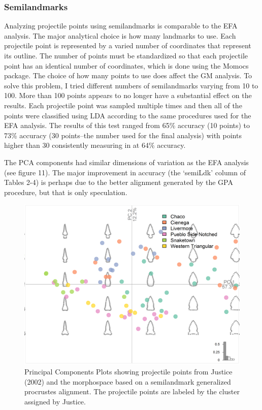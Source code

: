 \documentclass[a4paper]{article}
\begin{document}
\hypertarget{semilandmarks}{%
\subsubsection*{Semilandmarks}\label{semilandmarks}}

Analyzing projectile points using semilandmarks is comparable to the EFA analysis. The major analytical choice is how many landmarks to use. Each projectile point is represented by a varied number of coordinates that represent its outline. The number of points must be standardized so that each projectile point has an identical number of coordinates, which is done using the Momocs package. The choice of how many points to use does affect the GM analysis. To solve this problem, I tried different numbers of semilandmarks varying from 10 to 100. More than 100 points appears to no longer have a substantial effect on the results. Each projectile point was sampled multiple times and then all of the points were classified using LDA according to the same procedures used for the EFA analysis. The results of this test ranged from 65\% accuracy (10 points) to 73\% accuracy (30 points--the number used for the final analysis) with points higher than 30 consistently measuring in at 64\% accuracy.

The PCA components had similar dimensions of variation as the EFA analysis (see figure 11). The major improvement in accuracy (the `semiLdk' column of Tables 2-4) is perhaps due to the better alignment generated by the GPA procedure, but that is only speculation.

\begin{figure}
\includegraphics[width=1\linewidth]{figures/JusticeSLDKPCA} \caption{Principal Components Plots showing projectile points from Justice (2002) and the morphospace based on a semilandmark generalized procrustes alignment. The projectile points are labeled by the cluster assigned by Justice.}\label{fig:JusticeSLDKPCA}
\end{figure}
\end{document}

